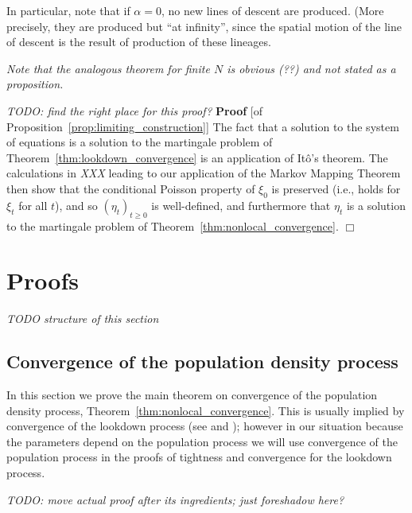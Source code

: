\documentclass[12pt]{article}
\newenvironment {proof}{{\noindent\bf Proof }}{\hfill $\Box$ \medskip}
\newcommand{\lp}{\xi}              %
\newcommand{\comment}[1]{{\color{blue} \it #1}}
\begin{document}
In particular, note that if $\alpha=0$,
no new lines of descent are produced.
(More precisely, they are produced but ``at infinity'',
since the spatial motion of the line of descent is the result of production of these lineages.

\comment{Note that the analogous theorem for finite $N$ is obvious (??) and not stated as a proposition.}

\comment{TODO: find the right place for this proof?}
\begin{proof}[of Proposition~\ref{prop:limiting_construction}]
    The fact that a solution to the system of equations
    is a solution to the martingale problem of Theorem~\ref{thm:lookdown_convergence}
    is an application of It\^o's theorem.
    The calculations in \comment{XXX} leading to our application
    of the Markov Mapping Theorem then show that 
    the conditional Poisson property of $\lp_0$ is preserved
    (i.e., holds for $\lp_t$ for all $t$), and so
    $(\eta_t)_{t \ge 0}$ is well-defined,
    and furthermore that $\eta_t$ is a solution
    to the martingale problem of Theorem~\ref{thm:nonlocal_convergence}.
\end{proof}

\section{Proofs}
\label{sec:proofs}

\comment{TODO structure of this section}

\subsection{Convergence of the population density process}
    \label{sec:population_density_proof}

In this section we prove the main theorem on convergence
of the population density process, Theorem~\ref{thm:nonlocal_convergence}.
This is usually implied by convergence of the lookdown process
(see \citet{kurtz/rodrigues:2011} and \citet{KE});
however in our situation because the parameters depend on the population process
we will use convergence of the population process
in the proofs of tightness and convergence for the lookdown process.

\comment{TODO: move actual proof after its ingredients; just foreshadow here?}
\end{document}
